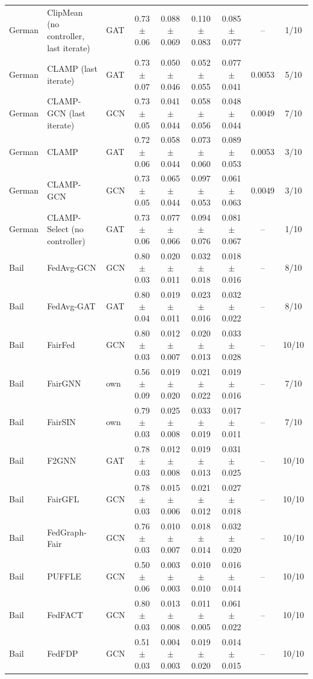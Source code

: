 \begin{longtable}{lp{2.2cm}lcccccc}
German & ClipMean (no controller, last iterate) & GAT & 0.73$\pm$0.06 & 0.088$\pm$0.069 & 0.110$\pm$0.083 & 0.085$\pm$0.077 & -- & 1/10 \\
German & CLAMP (last iterate) & GAT & 0.73$\pm$0.07 & 0.050$\pm$0.046 & 0.052$\pm$0.055 & 0.077$\pm$0.041 & 0.0053 & 5/10 \\
German & CLAMP-GCN (last iterate) & GCN & 0.73$\pm$0.05 & 0.041$\pm$0.044 & 0.058$\pm$0.056 & 0.048$\pm$0.044 & 0.0049 & 7/10 \\
German & CLAMP & GAT & 0.72$\pm$0.06 & 0.058$\pm$0.044 & 0.073$\pm$0.060 & 0.089$\pm$0.053 & 0.0053 & 3/10 \\
German & CLAMP-GCN & GCN & 0.73$\pm$0.05 & 0.065$\pm$0.044 & 0.097$\pm$0.053 & 0.061$\pm$0.063 & 0.0049 & 3/10 \\
German & CLAMP-Select (no controller) & GAT & 0.73$\pm$0.06 & 0.077$\pm$0.066 & 0.094$\pm$0.076 & 0.081$\pm$0.067 & -- & 1/10 \\
Bail & FedAvg-GCN & GCN & 0.80$\pm$0.03 & 0.020$\pm$0.011 & 0.032$\pm$0.018 & 0.018$\pm$0.016 & -- & 8/10 \\
Bail & FedAvg-GAT & GAT & 0.80$\pm$0.04 & 0.019$\pm$0.011 & 0.023$\pm$0.016 & 0.032$\pm$0.022 & -- & 8/10 \\
Bail & FairFed & GCN & 0.80$\pm$0.03 & 0.012$\pm$0.007 & 0.020$\pm$0.013 & 0.033$\pm$0.028 & -- & 10/10 \\
Bail & FairGNN & own & 0.56$\pm$0.09 & 0.019$\pm$0.020 & 0.021$\pm$0.022 & 0.019$\pm$0.016 & -- & 7/10 \\
Bail & FairSIN & own & 0.79$\pm$0.03 & 0.025$\pm$0.008 & 0.033$\pm$0.019 & 0.017$\pm$0.011 & -- & 7/10 \\
Bail & F2GNN & GAT & 0.78$\pm$0.03 & 0.012$\pm$0.008 & 0.019$\pm$0.013 & 0.031$\pm$0.025 & -- & 10/10 \\
Bail & FairGFL & GCN & 0.78$\pm$0.03 & 0.015$\pm$0.006 & 0.021$\pm$0.012 & 0.027$\pm$0.018 & -- & 10/10 \\
Bail & FedGraph-Fair & GCN & 0.76$\pm$0.03 & 0.010$\pm$0.007 & 0.018$\pm$0.014 & 0.032$\pm$0.020 & -- & 10/10 \\
Bail & PUFFLE & GCN & 0.50$\pm$0.06 & 0.003$\pm$0.003 & 0.010$\pm$0.010 & 0.016$\pm$0.014 & -- & 10/10 \\
Bail & FedFACT & GCN & 0.80$\pm$0.03 & 0.013$\pm$0.008 & 0.011$\pm$0.005 & 0.061$\pm$0.022 & -- & 10/10 \\
Bail & FedFDP & GCN & 0.51$\pm$0.03 & 0.004$\pm$0.003 & 0.019$\pm$0.020 & 0.014$\pm$0.015 & -- & 10/10 \\

\end{longtable}
